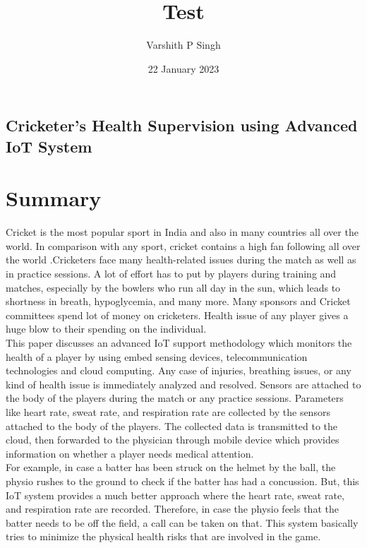 \documentclass{Cricketer's Health Supervision}
\title{Test}
\date{22 January 2023}
\author{Varshith P Singh}
\begin{document}
\maketitle
   \begin{center}
        \section*{Cricketer's Health Supervision using Advanced IoT System}
    \end{center}
\setlength{\columnsep}{1.0cm}
    \large
    \section*{Summary}
    Cricket is the most popular sport in India and also in many countries all over the world. In comparison with any sport, cricket contains a high fan following all over the world .Cricketers face many health-related issues during the match as well as in practice sessions. A lot of effort has to put by players during training and matches, especially by the bowlers who run all day in the sun, which leads to shortness in breath, hypoglycemia, and many more. Many sponsors and Cricket committees spend lot of money on cricketers. Health issue of any player gives a huge blow to their spending on the individual.\\
    
    This paper discusses an advanced IoT support methodology
    which monitors the health of a player by using embed
    sensing devices, telecommunication technologies and cloud computing. Any case of injuries, breathing issues, or any kind of health issue is immediately analyzed and resolved. Sensors are attached to the body of the players during the match or any practice sessions. Parameters like heart rate, sweat rate, and respiration rate are collected by the sensors attached to the body of the players. The collected data is transmitted to the cloud, then forwarded to the physician through
    mobile device which provides information on whether a player needs medical attention.\\
    
     For example, in case a batter has been struck on the helmet by the ball, the physio rushes to the ground to check if the batter has had a concussion. But, this IoT system provides a much better approach where the heart rate, sweat rate, and respiration rate are recorded. Therefore, in case the physio feels that the batter needs to be off the field, a call can be taken on that. 
     This system basically tries to minimize the physical health risks that are involved in the game.
    
\end{document}
